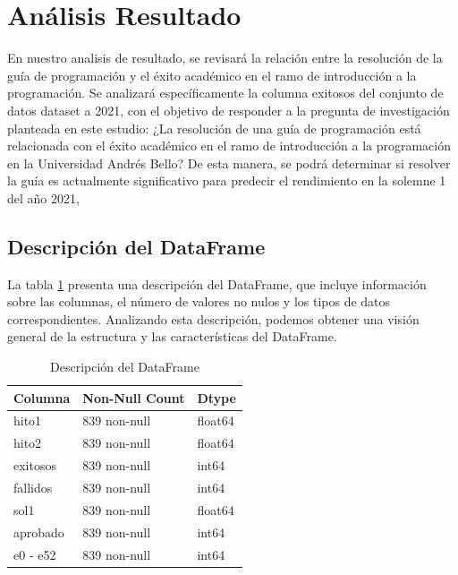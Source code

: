 \hypertarget{analisis_resultado}{%
    \section{Análisis Resultado}\label{Análisis Resultado}}

En nuestro analisis de resultado, se revisará la relación entre la resolución de la guía de programación y el éxito académico en el ramo de introducción a la programación. Se analizará específicamente la columna exitosos del conjunto de datos dataset a 2021, con el objetivo de responder a la pregunta de investigación planteada en este estudio: ¿La resolución de una guía de programación está relacionada con el éxito académico en el ramo de introducción a la programación en la Universidad Andrés Bello? De esta manera, se podrá determinar si resolver la guía es actualmente significativo para predecir el rendimiento en la solemne 1 del año 2021,

\subsection{Descripción del DataFrame}

La tabla \ref{tab:descripcion_dataframe} presenta una descripción del DataFrame, que incluye información sobre las columnas, el número de valores no nulos y los tipos de datos correspondientes. Analizando esta descripción, podemos obtener una visión general de la estructura y las características del DataFrame.

\begin{table}[H]
    \centering
    \caption{Descripción del DataFrame}
    \begin{tabular}{lll}
        \hline
        \textbf{Columna} & \textbf{Non-Null Count} & \textbf{Dtype} \\
        \hline
        hito1            & 839 non-null            & float64        \\
        hito2            & 839 non-null            & float64        \\
        exitosos         & 839 non-null            & int64          \\
        fallidos         & 839 non-null            & int64          \\
        sol1             & 839 non-null            & float64        \\
        aprobado         & 839 non-null            & int64          \\
        e0 - e52         & 839 non-null            & int64          \\
        \hline
    \end{tabular}%
    \label{tab:descripcion_dataframe}%
\end{table}%

